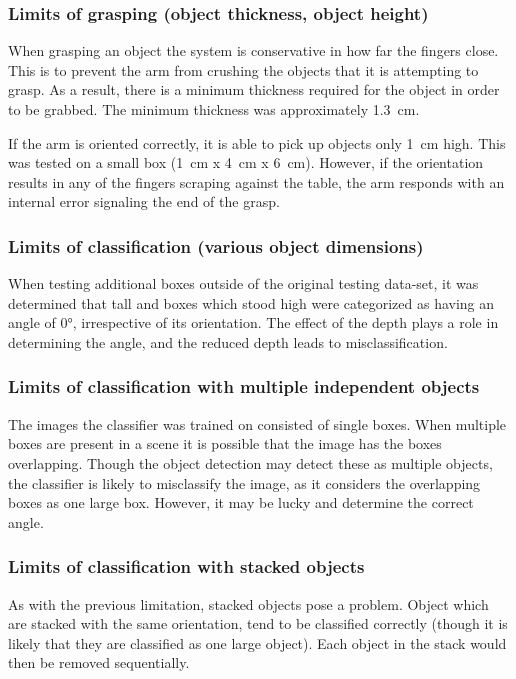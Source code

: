 \documentclass[letterpaper, 10 pt, conference]{conf/ieeeconf}  %
\begin{document}
\subsubsection{Limits of grasping (object thickness, object height)}
When grasping an object the system is conservative in how far the fingers close.
This is to prevent the arm from crushing the objects that it is attempting to
grasp. As a result, there is a minimum thickness required for the object in
order to be grabbed. The minimum thickness was approximately
\SI{1.3}{\centi\meter}.

If the arm is oriented correctly, it is able to pick up objects only
\SI{1}{\centi\meter} high. This was tested on a small box (\SI{1}{\centi\meter}
x \SI{4}{\centi\meter} x \SI{6}{\centi\meter}). However, if the orientation
results in any of the fingers scraping against the table, the arm responds with an internal error signaling the end of the grasp.

\subsubsection{Limits of classification (various object dimensions)}
When testing additional boxes outside of the original testing data-set, it was
determined that tall and boxes which stood high were categorized as having an
angle of \ang{0}, irrespective of its orientation. The effect of the depth plays
a role in determining the angle, and the reduced depth leads to
misclassification.

\subsubsection{Limits of classification with multiple independent objects}
The images the classifier was trained on consisted of single boxes. When
multiple boxes are present in a scene it is possible that the image has the
boxes overlapping. Though the object detection may detect these as multiple
objects, the classifier is likely to misclassify the image, as it considers the
overlapping boxes as one large box. However, it may be lucky and determine the
correct angle.
\subsubsection{Limits of classification with stacked objects}
As with the previous limitation, stacked objects pose a problem. Object which
are stacked with the same orientation, tend to be classified correctly (though
it is likely that they are classified as one large object). Each object in the
stack would then be removed sequentially.
\end{document}
